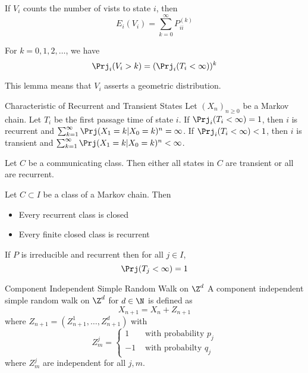 \documentclass[a4paper]{article}
\begin{document}
\begin{lmm}{}{} If $V_i$ counts the number of vists to state $i$, then $$E_i(V_i)=\sum_{k=0}^\infty P_{ii}^{(k)}$$
\end{lmm}

\begin{lmm}{}{} For $k=0,1,2,\dots$, we have $$\Prj_i(V_i>k)=(\Prj_i(T_i<\infty))^k$$
\end{lmm}

This lemma means that $V_i$ asserts a geometric distribution. 

\begin{thm}{Characteristic of Recurrent and Transient States}{} Let $(X_n)_{n\geq 0}$ be a Markov chain. Let $T_i$ be the first passage time of state $i$. If $\Prj_i(T_i<\infty)=1$, then $i$ is recurrent and $\sum_{k=1}^\infty\Prj(X_1=k|X_0=k)^n=\infty$. If $\Prj_i(T_i<\infty)<1$, then $i$ is transient and $\sum_{k=1}^\infty\Prj(X_1=k|X_0=k)^n<\infty$. 
\end{thm} 

\begin{thm}{}{} Let $C$ be a communicating class. Then either all states in $C$ are transient or all are recurrent. 
\end{thm}

\begin{thm}{}{} Let $C\subset I$ be a class of a Markov chain. Then
\begin{itemize}
\item Every recurrent class is closed
\item Every finite closed class is recurrent
\end{itemize}
\end{thm}

\begin{thm}{}{} If $P$ is irreducible and recurrent then for all $j\in I$, $$\Prj(T_j<\infty)=1$$
\end{thm}

\begin{defn}{Component Independent Simple Random Walk on $\Z^d$}{} A component independent simple random walk on $\Z^d$ for $d\in\N$ is defined as $$X_{n+1}=X_n+Z_{n+1}$$ where $Z_{n+1}=(Z_{n+1}^1,\dots,Z_{n+1}^d)$ with $$Z_m^j=\begin{cases}
1 & \text{ with probability }p_j\\
-1 & \text{ with probabilty }q_j
\end{cases}$$
where $Z_m^j$ are independent for all $j,m$. 
\end{defn}
\end{document}

